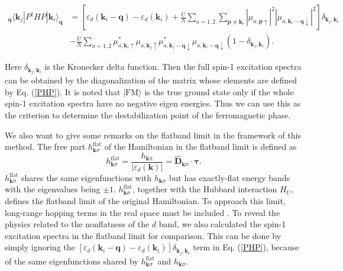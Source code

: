 \documentclass[amsmath,superscriptaddress,showpacs,aps,prb,twocolumn]{revtex4-1}
\begin{document}
\begin{widetext}
\begin{equation}\label{PHP}
\begin{aligned}
_\mathbf{q}\langle\mathbf{k}_j|P^\dagger HP|\mathbf{k}_i\rangle_\mathbf{q}&=\left[\varepsilon_d(\mathbf{k}_i-\mathbf{q})-\varepsilon_d(\mathbf{k}_i)
+\frac{U}{N}\sum_{a=1,2}\sum_{\mathbf{p}\neq\mathbf{k}_i}\left|\mu_{a,\mathbf{p}\uparrow}\right|^2\left|\mu_{a,\mathbf{k}_{i}-\mathbf{q}\downarrow}\right|^2
\right]\delta_{\mathbf{k}_j,\mathbf{k}_i} \\
& -\frac{U}{N}\sum_{a=1,2}
\mu^{\ast}_{a,\mathbf{k}_{i}\uparrow}\mu_{a,\mathbf{k}_{j}\uparrow}\mu^{\ast}_{a,\mathbf{k}_j-\mathbf{q}\downarrow}\mu_{a,\mathbf{k}_i-\mathbf{q}\downarrow}
\left(1-\delta_{\mathbf{k}_j,\mathbf{k}_i}\right).
\end{aligned}
\end{equation}
\end{widetext}
Here $\delta_{\mathbf{k}_j,\mathbf{k}_i}$ is the Kronecker delta function. Then the full spin-1 excitation spectra can be obtained by the diagonalization of the matrix whose elements are defined by Eq. (\ref{PHP}). It is noted that $|\text{FM}\rangle$ is the true ground state only if the whole spin-1 excitation spectra have no negative eigen energies. Thus we can use this as the criterion to determine the destabilization point of the ferromagnetic phase.
\par We also want to give some remarks on the flatband limit in the framework of this method. The free part $h^\text{flat}_{\mathbf{k}\sigma}$ of the Hamiltonian in the flatband limit is defined as
\begin{equation}
h^{\text{flat}}_{\mathbf{k}\sigma}=\frac{h_{\mathbf{k}\sigma}}{\left|\varepsilon_{d}(\mathbf{k})\right|}={\hat{\mathbf{D}}_{\mathbf{k}\sigma}}\cdot\mathbf{\tau}.
\end{equation}
$h^\text{flat}_{\mathbf{k}\sigma}$ shares the same eigenfunctions with $h_{\mathbf{k}\sigma}$ but has exactly-flat energy bands with the eigenvalues being $\pm 1$. $h^\text{flat}_{\mathbf{k}\sigma}$, together with the Hubbard interaction $H_U$, defines the flatband limit of the original Hamiltonian. To approach this limit, long-range hopping terms in the real space must be included \cite{NSCM_PRL2011}. To reveal the physics related to the nonflatness of the $d$ band, we also calculated the spin-1 excitation spectra in the flatband limit for comparison. This can be done by simply ignoring the $\left[\varepsilon_d(\mathbf{k}_i-\mathbf{q})-\varepsilon_d(\mathbf{k}_i)\right]\delta_{\mathbf{k}_j,\mathbf{k}_i}$ term in Eq. (\ref{PHP}), because of the same eigenfunctions shared by $h^\text{flat}_{\mathbf{k}\sigma}$ and $h_{\mathbf{k}\sigma}$.
\end{document}
